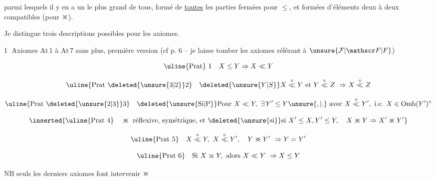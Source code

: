 
parmi lesquels il y en a un le plus grand de tous, formé de \uline{toutes} les parties  fermées pour $\leq$, et formées d'éléments deux à deux compatibles (pour $\mathrel{>\mkern-13mu<}$).

Je distingue trois descriptions possibles pour les axiomes.

\textcircled{1}  Axiomes $\mathrm{At}\,1$ à $\mathrm{At}\,7$ sans plus, première version (cf p. 6 -- je laisse tomber les axiomes référant à $\unsure{\mathcal F|\mathscr F|F}$)



\[
\text{\uline{Prat} 1}\quad X\leq Y\Rightarrow X\ll Y
\]


\[
\text{\uline{Prat \deleted{\unsure{3|2}}2}}\quad \deleted{\unsure{Y|S}}X\overset{\circ}{\ll}Y\ \text{et}\ Y\overset{\circ}{\ll}Z\ \Rightarrow X\overset{\circ}{\ll}Z
\]


\[
\text{\uline{Prat \deleted{\unsure{2|3}}3}}\quad
\text{\deleted{\unsure{Si|P}}Pour }X\ll Y,\ \exists\,Y'\leq Y\unsure{,|.}\ \text{avec }X\overset{\circ}{\ll}Y',\ \text{i.e. } X\in\mathrm{Omb}(Y')^{\circ}
\]

\[
\inserted{\text{\uline{Prat 4}}\quad \mathrel{>\mkern-13mu<}\ \text{réflexive, symétrique, et \deleted{\unsure{si}}si }X'\leq X,Y'\leq Y,\quad X\mathrel{>\mkern-13mu<}Y\Rightarrow X'\mathrel{>\mkern-13mu<}Y'}
\]


\[
\text{\uline{Prat 5}}\quad X\overset{\circ}{\ll}Y,\ X\overset{\circ}{\ll}Y',\quad Y\mathrel{>\mkern-13mu<}Y'\ \Rightarrow Y=Y'
\]


\[
\text{\uline{Prat 6}}\quad \text{Si }X\mathrel{>\mkern-13mu<}Y,\ \text{alors }X\ll Y\ \Rightarrow X\leq Y
\]

NB seuls les  derniers axiomes font intervenir $\mathrel{>\mkern-13mu<}$

